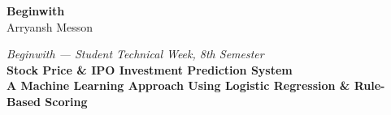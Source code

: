 \documentclass{article}
\newcommand{\headfont}{\fontsize{54}{62}\selectfont}
\newcommand{\subheadfont}{\fontsize{32}{38}\selectfont}
\newcommand{\sectionfont}{\fontsize{24}{28}\selectfont}
\newcommand{\bodyfont}{\fontsize{20}{24}\selectfont}
\begin{document}
\begin{tcolorbox}[
  colback=bwblue, colframe=bwblue,
  arc=0pt, boxrule=0pt,
  top=14pt, bottom=10pt, left=18pt, right=18pt,
  borderline south={5pt}{0pt}{gold},
  width=\linewidth,
]
  \begin{minipage}[c]{0.12\linewidth}\centering
    {\color{white}\fontsize{42}{48}\bfseries\selectfont Beginwith}\\[5pt]
    {\color{lgblue}\sectionfont Arryansh Messon}
  \end{minipage}\hfill
  \begin{minipage}[c]{0.86\linewidth}\centering
    {\color{lgblue}\bodyfont\itshape
      Beginwith --- Student Technical Week, 8th Semester}\\[5pt]
    {\color{white}\headfont\bfseries
      Stock Price \& IPO Investment Prediction System}\\[6pt]
    {\color{gold}\subheadfont\bfseries
      A Machine Learning Approach Using Logistic Regression \& Rule-Based Scoring}
  \end{minipage}
\end{tcolorbox}
\bodyfont
\noindent
\end{document}
